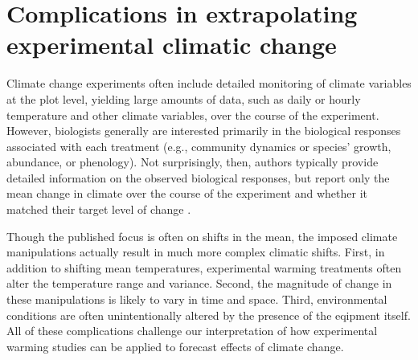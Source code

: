 \documentclass{article}
\begin{document}
\section* {Complications in extrapolating experimental climatic change}
Climate change experiments often include detailed monitoring of climate variables at the plot level, yielding large amounts of data, such as daily or hourly temperature and other climate variables, over the course of the experiment. However, biologists generally are interested primarily in the biological responses associated with each treatment (e.g., community dynamics or species' growth, abundance, or phenology). Not surprisingly, then, authors typically provide detailed information on the observed biological responses, but report only the mean change in climate over the course of the experiment and whether it matched their target level of change \citep[e.g.][]{price1998,clark2014a,clark2014b,rollinson2012}. 
\par Though the published focus is often on shifts in the mean, the imposed climate manipulations actually result in much more complex climatic shifts. First, in addition to shifting mean temperatures, experimental warming treatments often alter the temperature range and variance. Second, the magnitude of change in these manipulations is likely to vary in time and space. Third, environmental conditions are often unintentionally altered by the presence of the eqipment itself. All of these complications challenge our interpretation of how experimental warming studies can be applied to forecast effects of climate change.
\end{document}
